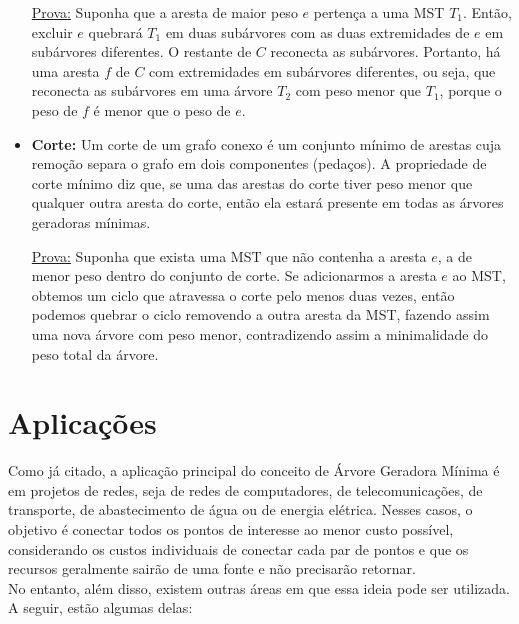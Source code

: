 \documentclass{article}
\begin{document}
\begin{itemize}
    \underline{Prova:} Suponha que a aresta de maior peso $e$ pertença a uma MST $T_1$. Então, excluir $e$ quebrará $T_1$ em duas subárvores com as duas extremidades de $e$ em subárvores diferentes. O restante de $C$ reconecta as subárvores. Portanto, há uma aresta $f$ de $C$ com extremidades em subárvores diferentes, ou seja, que reconecta as subárvores em uma árvore $T_2$ com peso menor que $T_1$, porque o peso de $f$ é menor que o peso de $e$.

    \item \textbf{Corte:} Um corte de um grafo conexo é um conjunto mínimo de arestas cuja remoção separa o grafo em dois componentes (pedaços). A propriedade de corte mínimo diz que, se uma das arestas do corte tiver peso menor que qualquer outra aresta do corte, então ela estará presente em todas as árvores geradoras mínimas.
    
    \underline{Prova:} Suponha que exista uma MST que não contenha a aresta $e$, a de menor peso dentro do conjunto de corte. Se adicionarmos a aresta $e$ ao MST, obtemos um ciclo que atravessa o corte pelo menos duas vezes, então podemos quebrar o ciclo removendo a outra aresta da MST, fazendo assim uma nova árvore com peso menor, contradizendo assim a minimalidade do peso total da árvore.

\end{itemize}

\section{Aplicações}

Como já citado, a aplicação principal do conceito de Árvore Geradora Mínima é em projetos de redes, seja de redes de computadores, de telecomunicações, de transporte, de abastecimento de água ou de energia elétrica. Nesses casos, o objetivo é conectar todos os pontos de interesse ao menor custo possível, considerando os custos individuais de conectar cada par de pontos e que os recursos geralmente sairão de uma fonte e não precisarão retornar. \\

No entanto, além disso, existem outras áreas em que essa ideia pode ser utilizada. A seguir, estão algumas delas: \\
\end{document}
